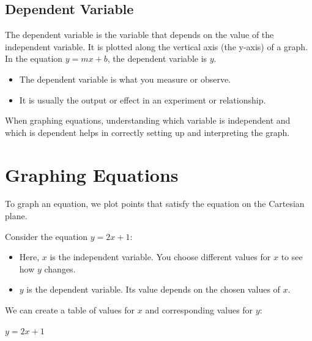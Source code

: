 \documentclass{article}
\begin{document}
\subsection*{Dependent Variable}

The dependent variable is the variable that depends on the value of the independent variable. It is plotted along the vertical axis (the y-axis) of a graph. In the equation \( y = mx + b \), the dependent variable is \( y \).

\begin{itemize}
    \item The dependent variable is what you measure or observe.
    \item It is usually the output or effect in an experiment or relationship.
\end{itemize}

When graphing equations, understanding which variable is independent and which is dependent helps in correctly setting up and interpreting the graph.

\section*{Graphing Equations}

To graph an equation, we plot points that satisfy the equation on the Cartesian plane. 

Consider the equation \( y = 2x + 1 \):

\begin{itemize}
    \item Here, \( x \) is the independent variable. You choose different values for \( x \) to see how \( y \) changes.
    \item \( y \) is the dependent variable. Its value depends on the chosen values of \( x \).
\end{itemize}

We can create a table of values for $x$ and corresponding values for $y$:

\vspace{12pt}

\begin{center}
\par\vspace{1em}
\large{$y=2x+1$}
\end{center}
\end{document}
